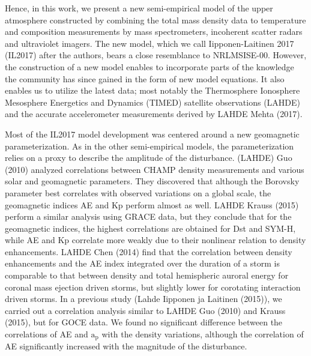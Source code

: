 \documentclass[referee,a4paper,12pt,traditabstract]{swsc}
\begin{document}
\begin{linenumbers}
Hence, in this work, we present a new semi-empirical model of the upper atmosphere constructed by combining the total mass density data to temperature and composition measurements by mass spectrometers, incoherent scatter radars and ultraviolet imagers. The new model, which we call Iipponen-Laitinen 2017 (IL2017) after the authors, bears a close resemblance to NRLMSISE-00. However, the construction of a new model enables to incorporate parts of the knowledge the community has since gained in the form of new model equations. It also enables us to utilize the latest data; most notably the Thermosphere Ionosphere Mesosphere Energetics and Dynamics (TIMED) satellite observations (LAHDE) and the accurate accelerometer measurements derived by LAHDE Mehta (2017). 

Most of the IL2017 model development was centered around a new geomagnetic parameterization. As in the other semi-empirical models, the parameterization relies on a proxy to describe the amplitude of the disturbance. (LAHDE) Guo (2010) analyzed correlations between CHAMP density measurements and various solar and geomagnetic parameters. They discovered that although the Borovsky parameter best correlates with observed variations on a global scale, the geomagnetic indices AE and Kp perform almost as well. LAHDE Krauss (2015) perform a similar analysis using GRACE data, but they conclude that for the geomagnetic indices, the highest correlations are obtained for Dst and SYM-H, while AE and Kp correlate more weakly due to their nonlinear relation to density enhancements. LAHDE Chen (2014) find that the correlation between density enhancements and the AE index integrated over the duration of a storm is comparable to that between density and total hemispheric auroral energy for coronal mass ejection driven storms, but slightly lower for corotating interaction driven storms. In a previous study (Lahde Iipponen ja Laitinen (2015)), we carried out a correlation analysis similar to LAHDE Guo (2010) and Krauss (2015), but for GOCE data. We found no significant difference between the correlations of AE and $\mathrm{a_{p}}$ with the density variations, although the correlation of AE significantly increased with the magnitude of the disturbance. 


\end{linenumbers}
\end{document}

